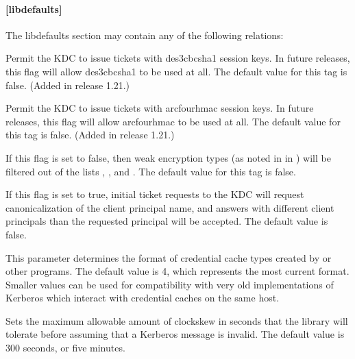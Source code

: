 \documentclass[letterpaper,10pt,english]{sphinxmanual}
\begin{document}
\paragraph{{[}libdefaults{]}}
\label{\detokenize{admin/conf_files/krb5_conf:libdefaults}}\label{\detokenize{admin/conf_files/krb5_conf:id1}}
\sphinxAtStartPar
The libdefaults section may contain any of the following relations:
\begin{description}
\sphinxAtStartPar
Permit the KDC to issue tickets with des3\sphinxhyphen{}cbc\sphinxhyphen{}sha1 session keys.
In future releases, this flag will allow des3\sphinxhyphen{}cbc\sphinxhyphen{}sha1 to be used
at all.  The default value for this tag is false.  (Added in
release 1.21.)

\sphinxAtStartPar
Permit the KDC to issue tickets with arcfour\sphinxhyphen{}hmac session keys.
In future releases, this flag will allow arcfour\sphinxhyphen{}hmac to be used
at all.  The default value for this tag is false.  (Added in
release 1.21.)

\sphinxAtStartPar
If this flag is set to false, then weak encryption types (as noted
in {\hyperref[\detokenize{admin/conf_files/kdc_conf:encryption-types}]{}} in {\hyperref[\detokenize{admin/conf_files/kdc_conf:kdc-conf-5}]{}}) will be filtered
out of the lists ,
, and .  The default
value for this tag is false.

\sphinxAtStartPar
If this flag is set to true, initial ticket requests to the KDC
will request canonicalization of the client principal name, and
answers with different client principals than the requested
principal will be accepted.  The default value is false.

\sphinxAtStartPar
This parameter determines the format of credential cache types
created by  or other programs.  The default value
is 4, which represents the most current format.  Smaller values
can be used for compatibility with very old implementations of
Kerberos which interact with credential caches on the same host.

\sphinxAtStartPar
Sets the maximum allowable amount of clockskew in seconds that the
library will tolerate before assuming that a Kerberos message is
invalid.  The default value is 300 seconds, or five minutes.


\end{description}
\end{document}
